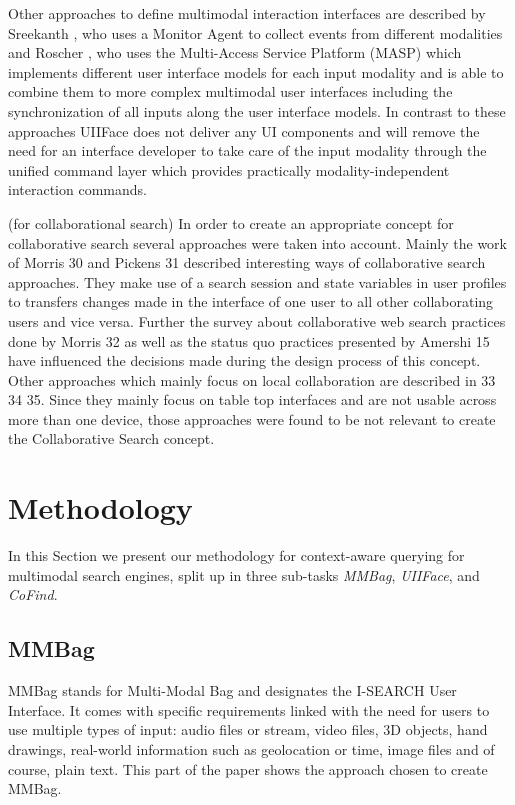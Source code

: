\documentclass[runningheads,a4paper]{llncs} \usepackage[utf8]{inputenc}
\begin{document}
Other approaches to define multimodal interaction interfaces are described by
Sreekanth \cite{sreekanth}, who uses a Monitor Agent to collect events from
different modalities and Roscher \cite{roscher}, who uses the Multi-Access
Service Platform (MASP) which implements different user interface models for
each input modality and is able to combine them to more complex multimodal user
interfaces including the synchronization of all inputs along the user interface
models. In contrast to these approaches UIIFace does not deliver any UI
components and will remove the need for an interface developer to take care of
the input modality through the unified command layer which provides practically
modality-independent interaction commands.

(for collaborational search)
In order to create an appropriate concept for collaborative search several
approaches were taken into account. Mainly the work of Morris 30 and Pickens
31 described interesting ways of collaborative search approaches.  They make
use of a search session and state variables in user profiles to transfers
changes made in the interface of one user to all other collaborating users and
vice versa. Further the survey about collaborative web search practices done by
Morris 32 as well as the status quo practices presented by Amershi 15 have
influenced the decisions made during the design process of this concept. Other
approaches which mainly focus on local collaboration are described in 33 34
35. Since they mainly focus on table top interfaces and are not usable across
more than one device, those approaches were found to be not relevant to create
the Collaborative Search concept.

\section{Methodology}
In this Section we present our methodology for context-aware querying for multimodal search engines, split up in three sub-tasks \emph{MMBag}, \emph{UIIFace}, and \emph{CoFind}.

\subsection{MMBag}
MMBag stands for Multi-Modal Bag and designates the \mbox{I-SEARCH} User
Interface. It comes with specific requirements linked with the need for users to use multiple types of input: audio files or stream, video files, 3D objects, hand drawings, real-world information such as geolocation or time, image files and of course, plain text. This part of the paper shows the approach chosen to create MMBag.
\end{document}
